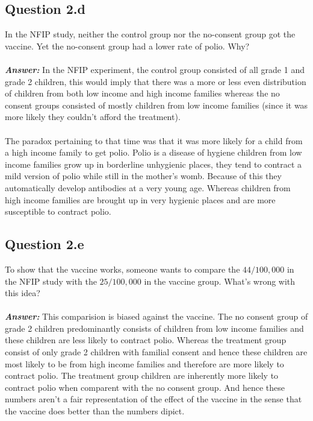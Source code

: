 \documentclass{article}
\begin{document}
\subsection{Question 2.d}
In the NFIP study, neither the control group nor the no-consent group got the vaccine. Yet the no-consent group had a lower rate of polio. Why?
\\
\\
\textit{\textbf{Answer: }} In the NFIP experiment, the control group consisted of all grade 1 and grade 2 children, this would imply that there was a more or less even distribution of children from both low income and high income families whereas the no consent groups consisted of mostly children from low income families (since it was more likely they couldn't afford the treatment).
\\\\
The paradox pertaining to that time was that it was more likely for a child from a high income family to get polio. Polio is a disease of hygiene children from low income families grow up in borderline unhygienic places, they tend to contract a mild version of polio while still in the mother's womb. Because of this they automatically develop antibodies at a very young age. Whereas children from high income families are brought up in very hygienic places and are more susceptible to contract polio.

\subsection{Question 2.e}
To show that the vaccine works, someone wants to compare the $44/100,000$ in the NFIP study with the $25/100,000$ in the vaccine group. What’s wrong with this idea?
\\
\\
\textit{\textbf{Answer: }} This comparision is biased against the vaccine. The no consent group of grade 2 children predominantly consists of children from low income families and these children are less likely to contract polio. Whereas the treatment group consist of only grade 2 children with familial consent and hence these children are most likely to be from high income families and therefore are more likely to contract polio. The treatment group children are inherently more likely to contract polio when comparent with the no consent group. And hence these numbers aren't a fair representation of the effect of the vaccine in the sense that the vaccine does better than the numbers dipict.
\end{document}

